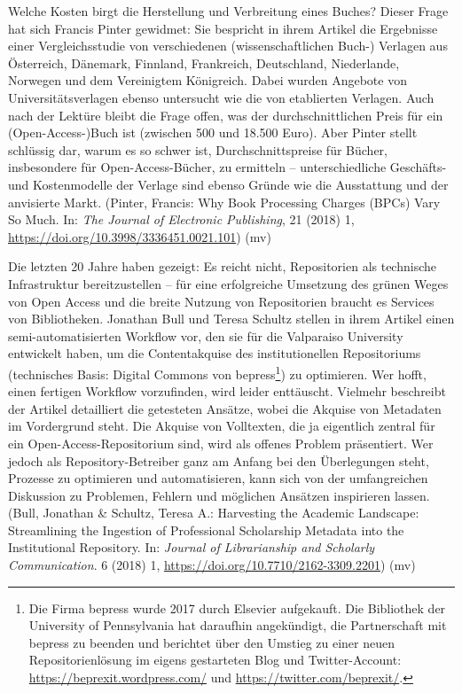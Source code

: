 \documentclass[a4paper,
fontsize=11pt,
oneside,
numbers=noperiodatend,
parskip=half-,
bibliography=totoc,
final
]{scrartcl}
\begin{document}
Welche Kosten birgt die Herstellung und Verbreitung eines Buches? Dieser
Frage hat sich Francis Pinter gewidmet: Sie bespricht in ihrem Artikel
die Ergebnisse einer Vergleichsstudie von verschiedenen
(wissenschaftlichen Buch-) Verlagen aus Österreich, Dänemark, Finnland,
Frankreich, Deutschland, Niederlande, Norwegen und dem Vereinigtem
Königreich. Dabei wurden Angebote von Universitätsverlagen ebenso
untersucht wie die von etablierten Verlagen. Auch nach der Lektüre
bleibt die Frage offen, was der durchschnittlichen Preis für ein
(Open-Access-)Buch ist (zwischen 500 und 18.500 Euro). Aber Pinter
stellt schlüssig dar, warum es so schwer ist, Durchschnittspreise für
Bücher, insbesondere für Open-Access-Bücher, zu ermitteln --
unterschiedliche Geschäfts- und Kostenmodelle der Verlage sind ebenso
Gründe wie die Ausstattung und der anvisierte Markt. (Pinter, Francis:
Why Book Processing Charges (BPCs) Vary So Much. In: \emph{The Journal
of Electronic Publishing}, 21 (2018) 1,
\url{https://doi.org/10.3998/3336451.0021.101}) (mv)

Die letzten 20 Jahre haben gezeigt: Es reicht nicht, Repositorien als
technische Infrastruktur bereitzustellen -- für eine erfolgreiche
Umsetzung des grünen Weges von Open Access und die breite Nutzung von
Repositorien braucht es Services von Bibliotheken. Jonathan Bull und
Teresa Schultz stellen in ihrem Artikel einen semi-automatisierten
Workflow vor, den sie für die Valparaiso University entwickelt haben, um
die Contentakquise des institutionellen Repositoriums (technisches
Basis: Digital Commons von bepress\footnote{Die Firma bepress wurde 2017
  durch Elsevier aufgekauft. Die Bibliothek der University of
  Pennsylvania hat daraufhin angekündigt, die Partnerschaft mit bepress
  zu beenden und berichtet über den Umstieg zu einer neuen
  Repositorienlösung im eigens gestarteten Blog und Twitter-Account:
  \url{https://beprexit.wordpress.com/} und
  \url{https://twitter.com/beprexit/}.}) zu optimieren. Wer hofft, einen
fertigen Workflow vorzufinden, wird leider enttäuscht. Vielmehr
beschreibt der Artikel detailliert die getesteten Ansätze, wobei die
Akquise von Metadaten im Vordergrund steht. Die Akquise von Volltexten,
die ja eigentlich zentral für ein Open-Access-Repositorium sind, wird
als offenes Problem präsentiert. Wer jedoch als Repository-Betreiber
ganz am Anfang bei den Überlegungen steht, Prozesse zu optimieren und
automatisieren, kann sich von der umfangreichen Diskussion zu Problemen,
Fehlern und möglichen Ansätzen inspirieren lassen. (Bull, Jonathan \&
Schultz, Teresa A.: Harvesting the Academic Landscape: Streamlining the
Ingestion of Professional Scholarship Metadata into the Institutional
Repository. In: \emph{Journal of Librarianship and Scholarly
Communication}. 6 (2018) 1,
\url{https://doi.org/10.7710/2162-3309.2201}) (mv)
\end{document}
